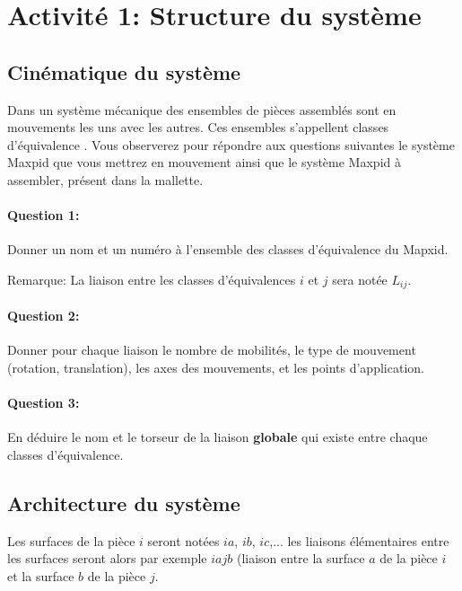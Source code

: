 

\section{Activité 1: Structure du système}

\subsection{Cinématique du système}

Dans un système mécanique des ensembles de pièces assemblés sont en mouvements les uns avec les autres. Ces ensembles s'appellent \og classes d'équivalence \fg. Vous observerez pour répondre aux questions suivantes le système Maxpid que vous mettrez en mouvement ainsi que le système Maxpid à assembler, présent dans la mallette.

\paragraph{Question 1:} Donner un nom et un  numéro à l'ensemble des classes d'équivalence du Mapxid.

\reponse[3]

Remarque: La liaison entre les classes d'équivalences $i$ et $j$ sera notée $L_{ij}$.

\paragraph{Question 2:} Donner pour chaque liaison le nombre de mobilités, le type de mouvement (rotation, translation), les axes des mouvements, et les points d'application.

\reponse[3]

\paragraph{Question 3:} En déduire le nom et le torseur de la liaison \textbf{globale} qui existe entre chaque classes d'équivalence.

\reponse[3]

\subsection{Architecture du système}

Les surfaces de la pièce $i$ seront notées $ia$, $ib$, $ic$,... les liaisons élémentaires entre les surfaces seront alors par exemple $iajb$ (liaison entre la surface $a$ de la pièce $i$ et la surface $b$ de la pièce $j$.

